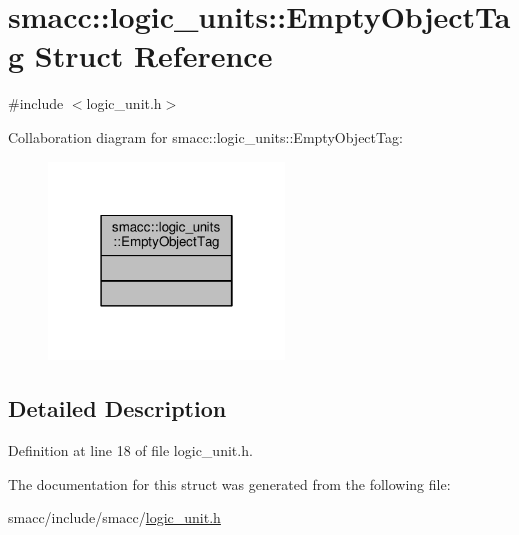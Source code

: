 \hypertarget{structsmacc_1_1logic__units_1_1EmptyObjectTag}{}\section{smacc\+:\+:logic\+\_\+units\+:\+:Empty\+Object\+Tag Struct Reference}
\label{structsmacc_1_1logic__units_1_1EmptyObjectTag}


{\ttfamily \#include $<$logic\+\_\+unit.\+h$>$}



Collaboration diagram for smacc\+:\+:logic\+\_\+units\+:\+:Empty\+Object\+Tag\+:\nopagebreak
\begin{figure}[H]
\begin{center}
\leavevmode
\includegraphics[width=178pt]{structsmacc_1_1logic__units_1_1EmptyObjectTag__coll__graph}
\end{center}
\end{figure}


\subsection{Detailed Description}


Definition at line 18 of file logic\+\_\+unit.\+h.



The documentation for this struct was generated from the following file\+:\begin{DoxyCompactItemize}
\item 
smacc/include/smacc/\hyperlink{logic__unit_8h}{logic\+\_\+unit.\+h}\end{DoxyCompactItemize}
